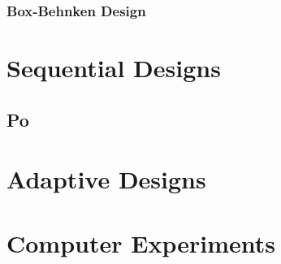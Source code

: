 \subsubsection{Box-Behnken Design}




\section{Sequential Designs}

\subsection{Po}



\section{Adaptive Designs}



\section{Computer Experiments}

